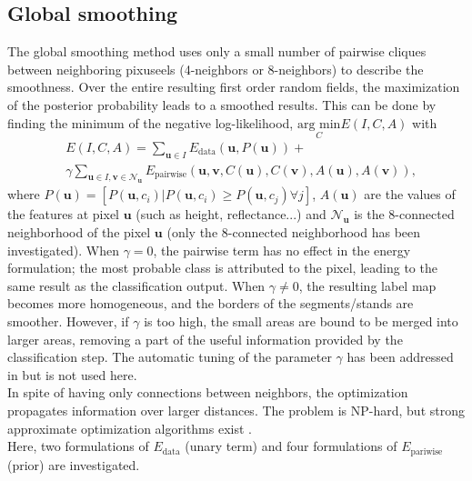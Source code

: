 \subsection{Global smoothing}
The global smoothing method uses only a small number of pairwise cliques between neighboring pixuseels (4-neighbors or 8-neighbors) to describe the smoothness. Over the entire resulting first order random fields, the maximization of the posterior probability leads to a smoothed results. This can be done by finding the minimum of the negative log-likelihood, $\underset{C}{\text{arg min}}E(I,C,A)$ with
\begin{equation}
\begin{aligned}
& E(I,C,A)=\sum_{\mathbf{u}\in I}E_{\text{data}}(\mathbf{u},P(\mathbf{u})) + \\
& \gamma\sum_{\mathbf{u} \in I, \mathbf{v} \in \mathcal{N}_{\mathbf{u}}} E_{\text{pairwise}}(\mathbf{u}, \mathbf{v}, C(\mathbf{u}), C(\mathbf{v}), A(\mathbf{u}), A(\mathbf{v})),
\end{aligned}
\end{equation}
where $P(\mathbf{u})=[P(\mathbf{u},c_{i})|P(\mathbf{u},c_{i}) \geq P(\mathbf{u},c_{j}) \forall j]$, $A(\mathbf{u})$ are the values of the features at pixel $\mathbf{u}$ (such as height, reflectance...) and $\mathcal{N}_{\mathbf{u}}$ is the 8-connected neighborhood of the pixel $\mathbf{u}$ (only the 8-connected neighborhood has been investigated). When $\gamma=0$, the pairwise term has no effect in the energy formulation; the most probable class is attributed to the pixel, leading to the same result as the classification output. When $\gamma \neq 0$, the resulting label map becomes more homogeneous, and the borders of the segments/stands are smoother. However, if $\gamma$ is too high, the small areas are bound to be merged into larger areas, removing a part of the useful information provided by the classification step. The automatic tuning of the parameter $\gamma$ has been addressed in \cite{Gab_MRF} but is not used here.\\

In spite of having only connections between neighbors, the optimization propagates information over larger distances. The problem is NP-hard, but strong approximate optimization algorithms exist \citep{boykov2001fast, kolmogorov2006convergent, felzenszwalb2006efficient}. \\

Here, two formulations of $E_{\text{data}}$ (unary term) and four formulations of $E_{\text{pariwise}}$ (prior) are investigated. \\
